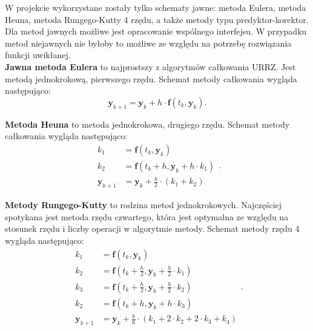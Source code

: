 W projekcie wykorzystane zostały tylko schematy jawne: metoda Eulera, metoda Heuna, metoda Rungego-Kutty 4 rzędu, a także metody typu predyktor-korektor. Dla metod jawnych możliwe jest opracowanie wspólnego interfejsu. W przypadku metod niejawnych nie byłoby to możliwe ze względu na potrzebę rozwiązania funkcji uwikłanej. \\

\textbf{Jawna metoda Eulera} to najprostszy z algorytmów całkowania URRZ. Jest metodą jednokrokową, pierwszego rzędu. Schemat metody całkowania wygląda następująco:
\[
	\bm{y}_{k+1} = \bm{y}_{k} + h \cdot  \bm{f} \left( t_{k}, \bm{y}_{k} \right).
\]

\textbf{Metoda Heuna} to metoda jednokrokowa, drugiego rzędu. Schemat metody całkowania wygląda następująco:
\[
	\begin{aligned}
	k_1 & =  \bm{f} \left( t_{k}, \bm{y}_{k} \right)\\
	k_2 & =  \bm{f} \left( t_{k} + h, \bm{y}_{k} +  h \cdot k_1  \right)\\
	\bm{y}_{k+1} & = \bm{y}_{k} + \frac{h}{2} \cdot  \left( k_1 + k_2 \right)
	\end{aligned}.
\]

\textbf{Metody Rungego-Kutty} to rodzina metod jednokrokowych. Najczęściej spotykana jest metoda rzędu czwartego, która jest optymalna ze względu na stosunek rzędu i liczby operacji w algorytmie metody. Schemat metody rzędu 4 wygląda następująco:
\[
	\begin{aligned}
	k_1 & =  \bm{f} \left( t_{k}, \bm{y}_{k} \right)\\
	k_2 & =  \bm{f} \left( t_{k} + \frac{h}{2}, \bm{y}_{k} + \frac{h}{2} \cdot k_1 \right)\\
	k_3 & =  \bm{f} \left( t_{k} + \frac{h}{2}, \bm{y}_{k} + \frac{h}{2} \cdot k_2 \right)\\
	k_2 & =  \bm{f} \left( t_{k} + h, \bm{y}_{k} +  h \cdot k_3  \right)\\
	\bm{y}_{k+1} & = \bm{y}_{k} + \frac{h}{6} \cdot  \left( k_1 + 2 \cdot k_2 + 2 \cdot k_3 +k_4 \right)
	\end{aligned}.
\]

